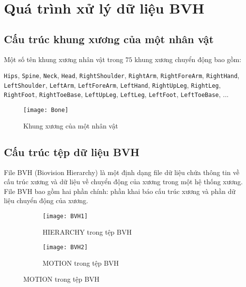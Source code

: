 \chapter{Quá trình xử lý dữ liệu BVH}
\label{appendix:BVHData}

\section{Cấu trúc khung xương của một nhân vật}
\label{appendix:BVHData:skeleton}

Một số tên khung xương nhân vật trong $75$ khung xương chuyển động bao gồm:

{
\small
\texttt{Hips},
\texttt{Spine},
\texttt{Neck},
\texttt{Head},
\texttt{RightShoulder},
\texttt{RightArm},
\texttt{RightForeArm},
\texttt{RightHand},
\texttt{LeftShoulder},
\texttt{LeftArm},
\texttt{LeftForeArm},
\texttt{LeftHand},
\texttt{RightUpLeg},
\texttt{RightLeg},
\texttt{RightFoot},
\texttt{RightToeBase},
\texttt{LeftUpLeg},
\texttt{LeftLeg},
\texttt{LeftFoot},
\texttt{LeftToeBase},
...
}



\begin{figure}[H]
\centering
\texttt{[image: Bone]}
\caption{Khung xương của một nhân vật}
\label{fig:Bone}
\end{figure}

\section{Cấu trúc tệp dữ liệu BVH}



File BVH (Biovision Hierarchy) là một định dạng file dữ liệu chứa thông tin về cấu trúc xương và dữ liệu về chuyển động của xương trong một hệ thống xương. File BVH bao gồm hai phần chính: phần khai báo cấu trúc xương và phần dữ liệu chuyển động của xương. 

\begin{figure}[htbp]
	\centering
	\begin{subfigure}{0.49\textwidth}
		\centering
		\texttt{[image: BVH1]}
		\caption{HIERARCHY trong tệp BVH}
		\label{fig:BVH1}
	\end{subfigure}
	\hfill
	\begin{subfigure}{0.49\textwidth}
		\centering
		\texttt{[image: BVH2]}
		\caption{MOTION trong tệp BVH}
		\label{fig:BVH2}
	\end{subfigure}
\end{figure}




